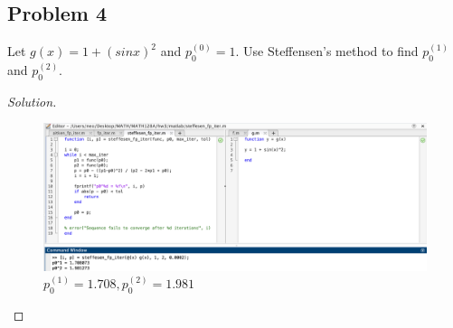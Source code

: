 \documentclass{article}
\begin{document}
\subsection*{Problem 4}
Let $g(x) = 1 + (sinx)^2$ and $p_0^{(0)} = 1$. Use Steffensen's method to find $p_0^{(1)}$ and 
$p_0^{(2)}$.
\begin{proof}[Solution]\indent
    \begin{figure}[htb!]
        \centering
        \includegraphics[scale=0.2]{2.5.4.png}
        \caption{$p_0^{(1)}=1.708, p_0^{(2)}=1.981$}
    \end{figure}
    
\end{proof}
\end{document}
